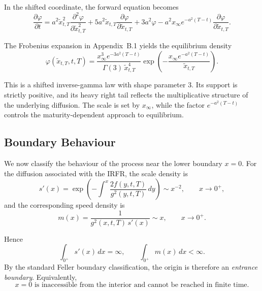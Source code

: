 \documentclass[12pt]{article}
\theoremstyle{statementstyle}
\begin{document}
In the shifted coordinate, the forward equation becomes
\begin{equation}
\frac{\partial \varphi}{\partial t}
=
a^{2}\widetilde{x}_{t,T}^{2}\frac{\partial^{2}\varphi}{\partial \widetilde{x}_{t,T}^{2}}
+
5a^{2}\widetilde{x}_{t,T}\frac{\partial \varphi}{\partial \widetilde{x}_{t,T}}
+
3a^{2}\varphi
-
a^{2}x_{\infty}e^{-a^{2}(T-t)}\frac{\partial \varphi}{\partial \widetilde{x}_{t,T}}.
\tag{4.1.1}
\end{equation}

The Frobenius expansion in Appendix~B.1 yields the equilibrium density
\begin{equation}
\varphi(\widetilde{x}_{t,T}, t, T)
=
\frac{x_{\infty}^{3}e^{-3a^{2}(T-t)}}{\Gamma(3)\,\widetilde{x}_{t,T}^{4}}
\exp\!\left(
-\frac{x_{\infty}e^{-a^{2}(T-t)}}{\widetilde{x}_{t,T}}
\right).
\label{eq:shiftedinversegammapdf}
\tag{4.1.2}
\end{equation}

This is a shifted inverse-gamma law with shape parameter \(3\). Its support is strictly
positive, and its heavy right tail reflects the multiplicative structure of the underlying
diffusion. The scale is set by \(x_{\infty}\), while the factor \(e^{-a^{2}(T-t)}\)
controls the maturity-dependent approach to equilibrium.
\subsection{Boundary Behaviour}
\label{sec:boundary}

We now classify the behaviour of the process near the lower boundary
\(x=0\). For the diffusion associated with the IRFR, the scale density is
\begin{equation}
s'(x)
=
\exp\!\left(
-\!\int^{x}
\frac{2f(y,t,T)}{g^{2}(y,t,T)}\,dy
\right)
\sim x^{-2},
\qquad x\to 0^{+},
\tag{4.2.1}\label{eq:scale-density}
\end{equation}
and the corresponding speed density is
\begin{equation}
m(x)
=
\frac{1}{g^{2}(x,t,T)\,s'(x)}
\sim x,
\qquad x\to 0^{+}.
\tag{4.2.2}\label{eq:speed-density}
\end{equation}

Hence
\[
\int_{0^{+}} s'(x)\,dx = \infty,
\qquad
\int_{0^{+}} m(x)\,dx < \infty.
\]
By the standard Feller boundary classification, the origin is therefore
an \emph{entrance boundary}. Equivalently,
\begin{equation}
\boxed{
x=0 \text{ is inaccessible from the interior and cannot be reached in finite time.}
}
\tag{4.2.3}\label{eq:boundary-classification}
\end{equation}
\end{document}
